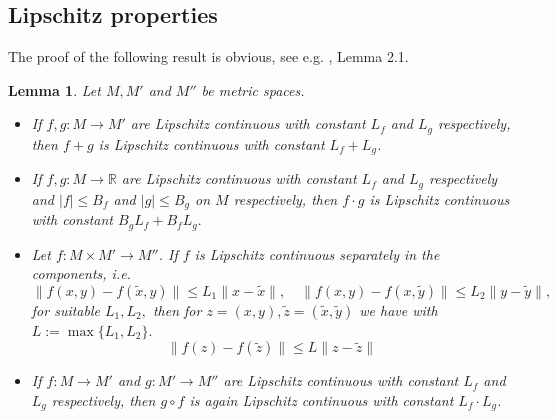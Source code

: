 \documentclass[reqno, 11pt]{amsart}%
\newcommand\RR{\mathbb R}
\newtheorem{lemma}[theorem]{Lemma}
\theoremstyle{definition}
\begin{document}
\subsection{Lipschitz properties}
The proof of the following result is obvious, see e.g. \cite{hinderer2005lipschitz}, Lemma 2.1. 
\begin{lemma}\label{lem:lipschitzproperties}
Let $M,M'$ and $M''$ be metric spaces.
\begin{itemize}
\item[a)] If $f,g:M\to M'$ are Lipschitz continuous with constant $L_f$ and $L_g$ respectively, then  $f +g$ is Lipschitz continuous with constant  $L_f+L_g$.
\item[b)] If $f,g:M\to \RR$ are Lipschitz continuous with constant $L_f$ and $L_g$ respectively and  $| f|\le B_f$ and $| g|\le B_g$ on $M$ respectively, then $f \cdot g$ is Lipschitz continuous with constant $B_g L_f+B_f L_g. $
\item[c)] Let $f:M\times M'\to M''$. If $f$ is  Lipschitz continuous separately in the components, i.e.
$$ \|f(x,y)-f(\tilde x,y)\| \le L_1 \|x-\tilde x\|, \quad \|f(x,y)-f(x,\tilde y)\| \le L_2 \|y-\tilde y\|,$$
for suitable $L_1,L_2,$ then for $z=(x,y), \tilde z=(\tilde x,\tilde y)$ we have with $L := \max\{L_1,L_2\}.$
$$ \|f(z)-f(\tilde z)\| \le L \|z-\tilde z\|$$
\item[d)] If $f:M\to M'$ and $g:M'\to M''$ are Lipschitz continuous with constant $L_f$ and $L_g$ respectively, then $g\circ f$ is again Lipschitz continuous with constant $L_f\cdot  L_g$.
\end{itemize}
\end{lemma}
\end{document}
